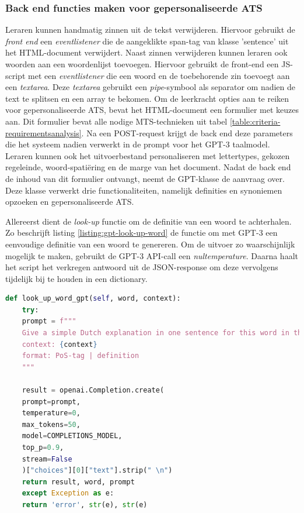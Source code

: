 \subsubsection{Back end functies maken voor gepersonaliseerde ATS}

Leraren kunnen handmatig zinnen uit de tekst verwijderen. Hiervoor gebruikt de \textit{front end} een \textit{eventlistener} die de aangeklikte span-tag van klasse 'sentence' uit het HTML-document verwijdert. Naast zinnen verwijderen kunnen leraren ook woorden aan een woordenlijst toevoegen. Hiervoor gebruikt de front-end een JS-script met een \textit{eventlistener} die een woord en de toebehorende zin toevoegt aan een \textit{textarea}. Deze \textit{textarea} gebruikt een \textit{pipe}-symbool als separator om nadien de text te splitsen en een array te bekomen. Om de leerkracht opties aan te reiken voor gepersonaliseerde ATS, bevat het HTML-document een formulier met keuzes aan. Dit formulier bevat alle nodige MTS-technieken uit tabel \ref{table:criteria-requirementsanalysis}. Na een POST-request krijgt de back end deze parameters die het systeem nadien verwerkt in de prompt voor het GPT-3 taalmodel. Leraren kunnen ook het uitvoerbestand personaliseren met lettertypes, gekozen regeleinde, woord-spatiëring en de marge van het document. Nadat de back end de inhoud van dit formulier ontvangt, neemt de GPT-klasse de aanvraag over. Deze klasse verwerkt drie functionaliteiten, namelijk definities en synoniemen opzoeken en gepersonaliseerde ATS.

\medspace

Allereerst dient de \textit{look-up} functie om de definitie van een woord te achterhalen. Zo beschrijft listing \ref{listing:gpt-look-up-word} de functie om met GPT-3 een eenvoudige definitie van een woord te genereren. Om de uitvoer zo waarschijnlijk mogelijk te maken, gebruikt de GPT-3 API-call een \textit{nultemperature}. Daarna haalt het script het verkregen antwoord uit de JSON-response om deze vervolgens tijdelijk bij te houden in een dictionary.

\begin{lstlisting}[language=Python, caption={Een functie om met GPT-3 een vereenvoudigde definitie voor een woord te genereren.}, label={listing:gpt-look-up-word}]
def look_up_word_gpt(self, word, context):
	try:
	prompt = f"""
	Give a simple Dutch explanation in one sentence for this word in the given context. Give the PoS-tag and Dutch definition: '{word}'
	context: {context}
	format: PoS-tag | definition
	"""

	result = openai.Completion.create(
	prompt=prompt,
	temperature=0,
	max_tokens=50,
	model=COMPLETIONS_MODEL,
	top_p=0.9,
	stream=False
	)["choices"][0]["text"].strip(" \n")    
	return result, word, prompt	
	except Exception as e:
	return 'error', str(e), str(e)
\end{lstlisting}


